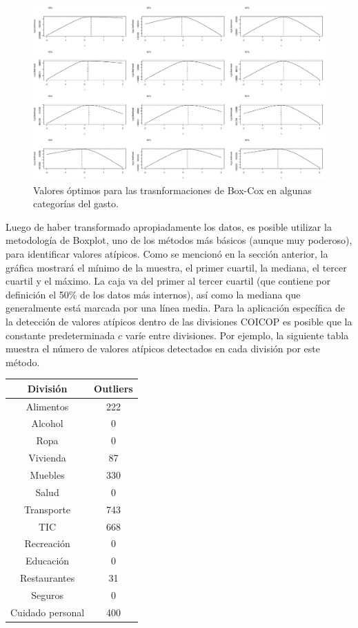\documentclass[
  12pt,
  spanish,
]{book}
\begin{document}
\begin{figure}
\includegraphics[width=0.5\linewidth]{Pics/ou1} \caption{Valores óptimos para las trasnformaciones de Box-Cox en algunas categorías del gasto.}\label{fig:figou1}
\end{figure}

Luego de haber transformado apropiadamente los datos, es posible utilizar la metodología de Boxplot, uno de los métodos más básicos (aunque muy poderoso), para identificar valores atípicos. Como se mencionó en la sección anterior, la gráfica mostrará el mínimo de la muestra, el primer cuartil, la mediana, el tercer cuartil y el máximo. La caja va del primer al tercer cuartil (que contiene por definición el 50\% de los datos más internos), así como la mediana que generalmente está marcada por una línea media. Para la aplicación específica de la detección de valores atípicos dentro de las divisiones COICOP es posible que la constante predeterminada \(c\) varíe entre divisiones. Por ejemplo, la siguiente tabla muestra el número de valores atípicos detectados en cada división por este método.

\begin{longtable}[]{@{}cc@{}}
\toprule
División & Outliers \\
\midrule
\endhead
Alimentos & 222 \\
Alcohol & 0 \\
Ropa & 0 \\
Vivienda & 87 \\
Muebles & 330 \\
Salud & 0 \\
Transporte & 743 \\
TIC & 668 \\
Recreación & 0 \\
Educación & 0 \\
Restaurantes & 31 \\
Seguros & 0 \\
Cuidado personal & 400 \\
\bottomrule
\end{longtable}
\end{document}
